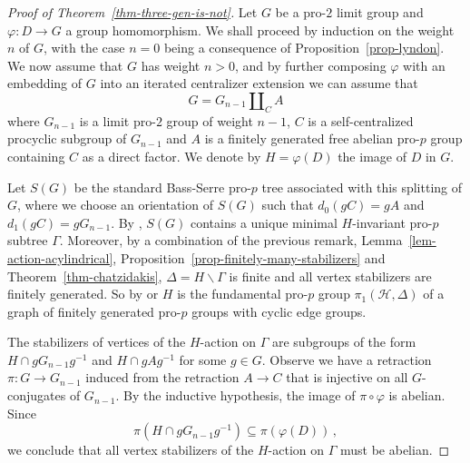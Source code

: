 \documentclass[a4paper]{amsart}
\newtheorem{thm}{Theorem}[section]
\theoremstyle{definition}
\begin{document}
\begin{proof}[Proof of Theorem~\ref{thm-three-gen-is-not}] Let \(G\) be a pro-\(2\) limit group and \(\varphi\colon D \to G\) a group homomorphism. We shall proceed by induction on the weight \(n\) of \(G\), with the case \(n=0\) being a consequence of Proposition~\ref{prop-lyndon}. We now assume that \(G\) has weight \(n > 0\), and by further composing \(\varphi\) with an embedding of \(G\) into an iterated centralizer extension we can assume that \[G = G_{n-1} \amalg_C A\] where \(G_{n-1}\) is a limit pro-\(2\) group of weight \(n-1\), \(C\) is a self-centralized procyclic subgroup of \(G_{n-1}\) and \(A\) is a finitely generated free abelian pro-\(p\) group containing \(C\) as a direct factor. We denote by \(H = \varphi(D)\) the image of \(D\) in \(G\).

Let \(S(G)\) be the standard Bass-Serre pro-\(p\) tree associated with this splitting of \(G\), where we choose an orientation of \(S(G)\) such that \(d_0(gC) = gA\) and \(d_1(gC) = gG_{n-1}\). By \cite[Lemma 3.11]{horizons}, \(S(G)\) contains a unique minimal \(H\)-invariant pro-\(p\) subtree \(\Gamma\). Moreover, by a combination of the previous remark, Lemma~\ref{lem-action-acylindrical}, Proposition~\ref{prop-finitely-many-stabilizers} and Theorem~\ref{thm-chatzidakis}, $\Delta=H\backslash \Gamma$ is finite and  all vertex stabilizers are finitely generated. So by \cite[Proposition 4.4]{ZM} or \cite[Theorem 6.6]{ribesProfiniteGraphsGroups2017} $H$ is the fundamental pro-$p$ group $\pi_1(\mathcal{H},\Delta)$ of a graph of finitely generated pro-$p$ groups with cyclic edge groups. 

The stabilizers of vertices of the \(H\)-action on \(\Gamma\) are subgroups of the form \(H \cap gG_{n-1}g^{-1}\) and \(H\cap gAg^{-1}\) for some \(g \in G\). Observe we have a retraction \(\pi\colon G \to G_{n-1}\) induced from the retraction \(A \to C\) that is injective on all \(G\)-conjugates of \(G_{n-1}\). By the inductive hypothesis, the image of \(\pi\circ \varphi\) is abelian. Since \[\pi(H\cap gG_{n-1}g^{-1}) \subseteq \pi(\varphi(D))\,,\] we conclude that all vertex stabilizers of the \(H\)-action on \(\Gamma\) must be abelian.


\end{proof}
\end{document}
